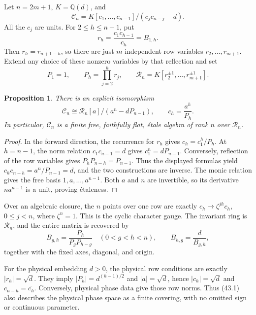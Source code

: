 \documentclass[11pt,reqno]{amsart}
\theoremstyle{plain}
\newtheorem{proposition}[theorem]{Proposition}
\begin{document}
Let \(n=2m+1\), \(K=\mathbb Q(d)\), and
\[
 \mathcal C_n=K[c_1,\ldots,c_{n-1}]/(c_jc_{n-j}-d).
\]
All the \(c_j\) are units. For \(2\le h\le n-1\), put
\[
 r_h=\frac{c_1c_{h-1}}{c_h}=B_{1,h}.
\]
Then \(r_h=r_{n+1-h}\), so there are just \(m\) independent
row variables \(r_2,\ldots,r_{m+1}\). Extend any choice of these
nonzero variables by that reflection and set
\[
 P_1=1,\qquad P_h=\prod_{j=2}^{h}r_j,\qquad
 \mathcal R_n=K[r_2^{\pm1},\ldots,r_{m+1}^{\pm1}].
\]

\begin{proposition}
There is an explicit isomorphism
\begin{equation*}
 \boxed{\mathcal C_n\cong
 \mathcal R_n[a]/(a^n-dP_{n-1}),\qquad
 c_h=\frac{a^h}{P_h}.} \tag{43.1}
\end{equation*}
In particular, \(\mathcal C_n\) is a finite free, faithfully flat,
\'etale algebra of rank \(n\) over \(\mathcal R_n\).
\end{proposition}

\begin{proof}
In the forward direction, the recurrence for \(r_h\)
gives \(c_h=c_1^h/P_h\). At \(h=n-1\), the norm relation
\(c_1c_{n-1}=d\) gives \(c_1^n=dP_{n-1}\). Conversely,
reflection of the row variables gives
\(P_hP_{n-h}=P_{n-1}\). Thus the displayed formulas yield
\(c_hc_{n-h}=a^n/P_{n-1}=d\), and the two constructions are
inverse. The monic relation gives the free basis
\(1,a,\ldots,a^{n-1}\). Both \(a\) and \(n\) are invertible,
so its derivative \(na^{n-1}\) is a unit, proving \'etaleness.
\end{proof}

Over an algebraic closure, the \(n\) points over one row are exactly
\(c_h\mapsto\zeta^{jh}c_h\), \(0\le j<n\), where
\(\zeta^n=1\). This is the cyclic character gauge. The invariant
ring is \(\mathcal R_n\), and the entire matrix is recovered by
\begin{equation*}
 B_{g,h}=\frac{P_h}{P_gP_{h-g}}\quad(0<g<h<n),\qquad
 B_{h,g}=\frac d{B_{g,h}}, \tag{43.2}
\end{equation*}
together with the fixed axes, diagonal, and origin.

For the physical embedding \(d>0\), the physical row conditions
are exactly \(|r_h|=\sqrt d\). They imply
\(|P_h|=d^{(h-1)/2}\) and \(|a|=\sqrt d\), hence
\(|c_h|=\sqrt d\) and \(c_{n-h}=\overline{c_h}\).
Conversely, physical phase data give those row norms. Thus (43.1)
also describes the physical phase space as a finite covering, with
no omitted sign or continuous parameter.
\end{document}
